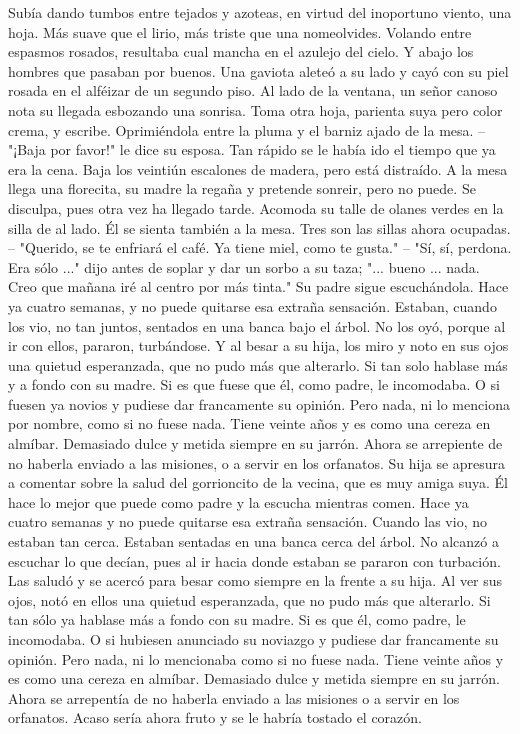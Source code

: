 \markdownRendererInterblockSeparator
{}Subía dando tumbos entre tejados y azoteas, en virtud del inoportuno viento, una hoja. Más suave que el lirio, más triste que una nomeolvides. Volando entre espasmos rosados, resultaba cual mancha en el azulejo del cielo. Y abajo los hombres que pasaban por buenos. Una gaviota aleteó a su lado y cayó con su piel rosada en el alféizar de un segundo piso. Al lado de la ventana, un señor canoso nota su llegada esbozando una sonrisa. Toma otra hoja, parienta suya pero color crema, y escribe. Oprimiéndola entre la pluma y el barniz ajado de la mesa.\markdownRendererInterblockSeparator
{}-- "¡Baja por favor!" le dice su esposa. Tan rápido se le había ido el tiempo que ya era la cena. Baja los veintiún escalones de madera, pero está distraído.\markdownRendererInterblockSeparator
{}A la mesa llega una florecita, su madre la regaña y pretende sonreir, pero no puede. Se disculpa, pues otra vez ha llegado tarde. Acomoda su talle de olanes verdes en la silla de al lado. Él se sienta también a la mesa. Tres son las sillas ahora ocupadas.\markdownRendererInterblockSeparator
{}-- "Querido, se te enfriará el café. Ya tiene miel, como te gusta."\markdownRendererInterblockSeparator
{}-- "Sí, sí, perdona. Era sólo ..." dijo antes de soplar y dar un sorbo a su taza; "... bueno ... nada. Creo que mañana iré al centro por más tinta."\markdownRendererInterblockSeparator
{}Su padre sigue escuchándola. Hace ya cuatro semanas, y no puede quitarse esa extraña sensación. Estaban, cuando los vio, no tan juntos, sentados en una banca bajo el árbol. No los oyó, porque al ir con ellos, pararon, turbándose. Y al besar a su hija, los miro y noto en sus ojos una quietud esperanzada, que no pudo más que alterarlo. Si tan solo hablase más y a fondo con su madre. Si es que fuese que él, como padre, le incomodaba. O si fuesen ya novios y pudiese dar francamente su opinión. Pero nada, ni lo menciona por nombre, como si no fuese nada. Tiene veinte años y es como una cereza en almíbar. Demasiado dulce y metida siempre en su jarrón. Ahora se arrepiente de no haberla enviado a las misiones, o a servir en los orfanatos.\markdownRendererInterblockSeparator
{}Su hija se apresura a comentar sobre la salud del gorrioncito de la vecina, que es muy amiga suya. Él hace lo mejor que puede como padre y la escucha mientras comen. Hace ya cuatro semanas y no puede quitarse esa extraña sensación. Cuando las vio, no estaban tan cerca. Estaban sentadas en una banca cerca del árbol. No alcanzó a escuchar lo que decían, pues al ir hacia donde estaban se pararon con turbación. Las saludó y se acercó para besar como siempre en la frente a su hija. Al ver sus ojos, notó en ellos una quietud esperanzada, que no pudo más que alterarlo. Si tan sólo ya hablase más a fondo con su madre. Si es que él, como padre, le incomodaba. O si hubiesen anunciado su noviazgo y pudiese dar francamente su opinión. Pero nada, ni lo mencionaba como si no fuese nada. Tiene veinte años y es como una cereza en almíbar. Demasiado dulce y metida siempre en su jarrón. Ahora se arrepentía de no haberla enviado a las misiones o a servir en los orfanatos. Acaso sería ahora fruto y se le habría tostado el corazón.\markdownRendererInterblockSeparator
